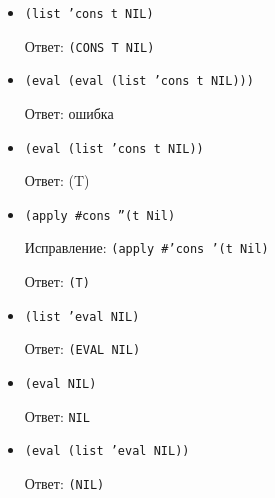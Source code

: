 \begin{itemize}
		\item \texttt{(list 'cons t NIL)}
		
		Ответ: \texttt{(CONS T NIL)}
		
		\item \texttt{(eval (eval (list 'cons t NIL)))}
		
		Ответ: ошибка
		
		\item \texttt{(eval (list 'cons t NIL))}
		
		Ответ: (T)
		
		\item \texttt{(apply \#cons ''(t Nil)}
		
		Исправление: \texttt{(apply \#'cons '(t Nil)}
		
		Ответ: \texttt{(T)}
		
		\item \texttt{(list 'eval NIL)}
		
		Ответ: \texttt{(EVAL NIL)}
		
		\item \texttt{(eval NIL)}
		
		Ответ: \texttt{NIL}
		
		\item \texttt{(eval (list 'eval NIL))}
		
		Ответ: \texttt{(NIL)}
\end{itemize}
